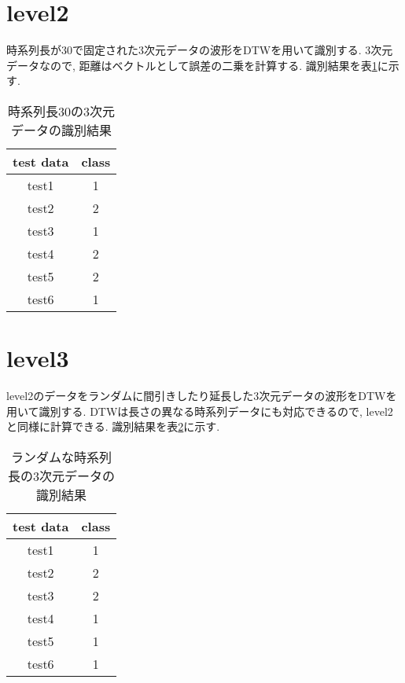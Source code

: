 	\section{level2}
	    時系列長が30で固定された3次元データの波形をDTWを用いて識別する.
        3次元データなので, 距離はベクトルとして誤差の二乗を計算する.
        識別結果を表\ref{tb:result2}に示す.

        \begin{table}[]
            \centering
            \caption{時系列長30の3次元データの識別結果}
            \begin{tabular}{|c|c|}
                \hline
                test data & class \\ \hline
                test1     & 1     \\ \hline
                test2     & 2     \\ \hline
                test3     & 1     \\ \hline
                test4     & 2     \\ \hline
                test5     & 2     \\ \hline
                test6     & 1     \\ \hline
            \end{tabular}
            \label{tb:result2}
        \end{table}
	
	\section{level3}
	    level2のデータをランダムに間引きしたり延長した3次元データの波形をDTWを用いて識別する.
        DTWは長さの異なる時系列データにも対応できるので, level2と同様に計算できる.
        識別結果を表\ref{tb:result3}に示す.


        \begin{table}[]
            \centering
            \caption{ランダムな時系列長の3次元データの識別結果}
            \begin{tabular}{|c|c|}
                \hline
                test data & class \\ \hline
                test1     & 1     \\ \hline
                test2     & 2     \\ \hline
                test3     & 2     \\ \hline
                test4     & 1     \\ \hline
                test5     & 1     \\ \hline
                test6     & 1     \\ \hline
            \end{tabular}
            \label{tb:result3}
        \end{table}
		
